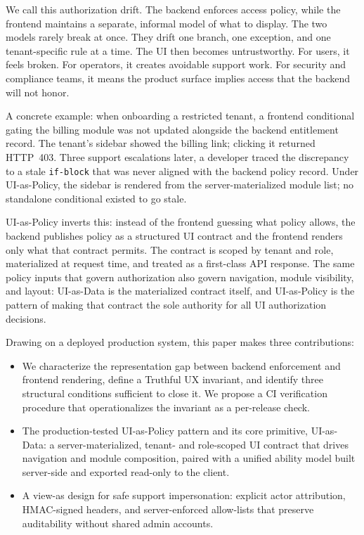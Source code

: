 \documentclass[10pt,journal]{IEEEtran}
\newcommand{\uiData}{UI-as-Data}
\newcommand{\uiPolicy}{UI-as-Policy}
\newcommand{\viewas}{view-as}
\newcommand{\code}[1]{{\small\textcolor{CausifyBlue}{\texttt{#1}}}}
\begin{document}
We call this authorization drift. The backend enforces access policy, while the frontend maintains a separate, informal model of what to display. The two models rarely break at once. They drift one branch, one exception, and one tenant-specific rule at a time. The UI then becomes untrustworthy. For users, it feels broken. For operators, it creates avoidable support work. For security and compliance teams, it means the product surface implies access that the backend will not honor.

A concrete example: when onboarding a restricted tenant, a frontend
conditional gating the billing module was not updated alongside the backend
entitlement record. The tenant's sidebar showed the billing link; clicking it
returned HTTP~403. Three support escalations later, a developer traced the
discrepancy to a stale \code{if-block} that was never aligned with the backend
policy record. Under \uiPolicy{}, the sidebar is rendered from the
server-materialized module list; no standalone conditional existed to go stale.

\uiPolicy{} inverts this: instead of the frontend guessing what policy
allows, the backend publishes policy as a structured UI contract and the
frontend renders only what that contract permits. The contract is scoped
by tenant and role, materialized at request time, and treated as a
first-class API response. The same policy inputs that govern authorization
also govern navigation, module visibility, and layout: \uiData{} is the
materialized contract itself, and \uiPolicy{} is the pattern of making that
contract the sole authority for all UI authorization decisions.

Drawing on a deployed production system, this paper makes three contributions:
\begin{itemize}[label=\textbullet, leftmargin=1.2em, topsep=2pt, itemsep=1pt, parsep=0pt, partopsep=0pt]
  \item We characterize the representation gap between backend
    enforcement and frontend rendering, define a Truthful UX invariant,
    and identify three structural conditions sufficient to close it.
    We propose a CI verification procedure that operationalizes the invariant
    as a per-release check.

  \item The production-tested \uiPolicy{} pattern and its core primitive, \uiData{}: a
    server-materialized, tenant- and role-scoped UI contract that drives
    navigation and module composition, paired with a unified ability model
    built server-side and exported read-only to the client.

  \item A \viewas{} design for safe support impersonation: explicit actor
    attribution, HMAC-signed headers, and server-enforced allow-lists that
    preserve auditability without shared admin accounts.
\end{itemize}
\end{document}
